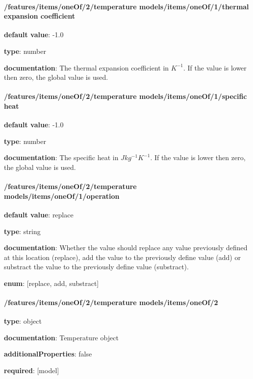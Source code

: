 \begin{itemized}
\end{itemized}\paragraph{/features/items/oneOf/2/temperature models/items/oneOf/1/thermal expansion coefficient} \begin{itemized}
\item {\bf default value}: -1.0
\item {\bf type}: number
\item {\bf documentation}: The thermal expansion coefficient in $K^{-1}$. If the value is lower then zero, the global value is used.
\end{itemized}\paragraph{/features/items/oneOf/2/temperature models/items/oneOf/1/specific heat} \begin{itemized}
\item {\bf default value}: -1.0
\item {\bf type}: number
\item {\bf documentation}: The specific heat in $J kg^{-1} K^{-1}$. If the value is lower then zero, the global value is used.
\end{itemized}\paragraph{/features/items/oneOf/2/temperature models/items/oneOf/1/operation} \begin{itemized}
\item {\bf default value}: replace
\item {\bf type}: string
\item {\bf documentation}: Whether the value should replace any value previously defined at this location (replace), add the value to the previously define value (add) or substract the value to the previously define value (substract).
\item {\bf enum}: [replace, add, substract]\end{itemized}\paragraph{/features/items/oneOf/2/temperature models/items/oneOf/2} \begin{itemized}
\item {\bf type}: object
\item {\bf documentation}: Temperature object
\item {\bf additionalProperties}: false
\item {\bf required}: [model]\end{itemized}

